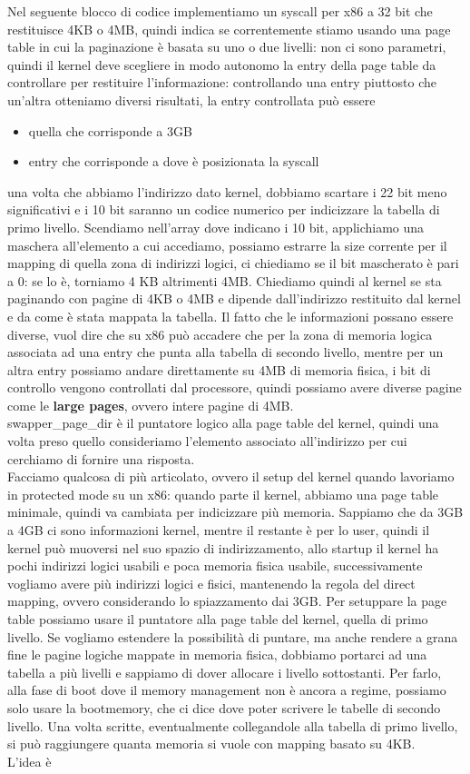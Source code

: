 \documentclass[12pt, oneside]{extbook}
\begin{document}
Nel seguente blocco di codice implementiamo un syscall per x86 a 32 bit che restituisce 4KB o 4MB, quindi indica se correntemente stiamo usando una page table in cui la paginazione è basata su uno o due livelli:
non ci sono parametri, quindi il kernel deve scegliere in modo autonomo la entry della page table da controllare per restituire l'informazione: controllando una entry piuttosto che un'altra otteniamo diversi risultati, la entry controllata può essere
\begin{itemize}
\item quella che corrisponde a 3GB
\item entry che corrisponde a dove è posizionata la syscall
\end{itemize}
una volta che abbiamo l'indirizzo dato kernel, dobbiamo scartare i 22 bit meno significativi e i 10 bit saranno un codice numerico per indicizzare la tabella di primo livello. Scendiamo nell'array dove indicano i 10 bit, applichiamo una maschera all'elemento a cui accediamo, possiamo estrarre la size corrente per il mapping di quella zona di indirizzi logici, ci chiediamo se il bit mascherato è pari a 0: se lo è, torniamo 4 KB altrimenti 4MB. Chiediamo quindi al kernel se sta paginando con pagine di 4KB o 4MB e dipende dall'indirizzo restituito dal kernel e da come è stata mappata la tabella. Il fatto che le informazioni possano essere diverse, vuol dire che su x86 può accadere che per la zona di memoria logica associata ad una entry che punta alla tabella di secondo livello, mentre per un altra entry possiamo andare direttamente su 4MB di memoria fisica, i bit di controllo vengono controllati dal processore, quindi possiamo avere diverse pagine come le \textbf{large pages}, ovvero intere pagine di 4MB.\\ \textsf{swapper\_page\_dir} è il puntatore logico alla page table del kernel, quindi una volta preso quello consideriamo l'elemento associato all'indirizzo per cui cerchiamo di fornire una risposta.\\ Facciamo qualcosa di più articolato, ovvero il setup del kernel quando lavoriamo in protected mode su un x86: quando parte il kernel, abbiamo una page table minimale, quindi va cambiata per indicizzare più memoria. Sappiamo che da 3GB a 4GB ci sono informazioni kernel, mentre il restante è per lo user, quindi il kernel può muoversi nel suo spazio di indirizzamento, allo startup il kernel ha pochi indirizzi logici usabili e poca memoria fisica usabile, successivamente vogliamo avere più indirizzi logici e fisici, mantenendo la regola del direct mapping, ovvero considerando lo spiazzamento dai 3GB. Per setuppare la page table possiamo usare il puntatore alla page table del kernel, quella di primo livello. Se vogliamo estendere la possibilità di puntare, ma anche rendere a grana fine le pagine logiche mappate in memoria fisica, dobbiamo portarci ad una tabella a più livelli e sappiamo di dover allocare i livello sottostanti. Per farlo, alla fase di boot dove il memory management non è ancora a regime, possiamo solo usare la bootmemory, che ci dice dove poter scrivere le tabelle di secondo livello. Una volta scritte, eventualmente collegandole alla tabella di primo livello, si può raggiungere quanta memoria si vuole con mapping basato su 4KB.\\ L'idea è
\end{document}
